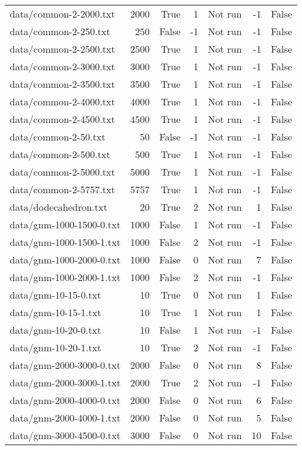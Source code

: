 \begin{tabular}{lrrrrrr}
data/common-2-2000.txt & 2000 & True & 1 & Not run & -1 & False \\
data/common-2-250.txt & 250 & False & -1 & Not run & -1 & False \\
data/common-2-2500.txt & 2500 & True & 1 & Not run & -1 & False \\
data/common-2-3000.txt & 3000 & True & 1 & Not run & -1 & False \\
data/common-2-3500.txt & 3500 & True & 1 & Not run & -1 & False \\
data/common-2-4000.txt & 4000 & True & 1 & Not run & -1 & False \\
data/common-2-4500.txt & 4500 & True & 1 & Not run & -1 & False \\
data/common-2-50.txt & 50 & False & -1 & Not run & -1 & False \\
data/common-2-500.txt & 500 & True & 1 & Not run & -1 & False \\
data/common-2-5000.txt & 5000 & True & 1 & Not run & -1 & False \\
data/common-2-5757.txt & 5757 & True & 1 & Not run & -1 & False \\
data/dodecahedron.txt & 20 & True & 2 & Not run & 1 & False \\
data/gnm-1000-1500-0.txt & 1000 & False & 1 & Not run & -1 & False \\
data/gnm-1000-1500-1.txt & 1000 & False & 2 & Not run & -1 & False \\
data/gnm-1000-2000-0.txt & 1000 & False & 0 & Not run & 7 & False \\
data/gnm-1000-2000-1.txt & 1000 & False & 2 & Not run & -1 & False \\
data/gnm-10-15-0.txt & 10 & True & 0 & Not run & 1 & False \\
data/gnm-10-15-1.txt & 10 & True & 1 & Not run & 1 & False \\
data/gnm-10-20-0.txt & 10 & False & 1 & Not run & -1 & False \\
data/gnm-10-20-1.txt & 10 & True & 2 & Not run & -1 & False \\
data/gnm-2000-3000-0.txt & 2000 & False & 0 & Not run & 8 & False \\
data/gnm-2000-3000-1.txt & 2000 & True & 2 & Not run & -1 & False \\
data/gnm-2000-4000-0.txt & 2000 & False & 0 & Not run & 6 & False \\
data/gnm-2000-4000-1.txt & 2000 & False & 0 & Not run & 5 & False \\
data/gnm-3000-4500-0.txt & 3000 & False & 0 & Not run & 10 & False \\

\end{tabular}
